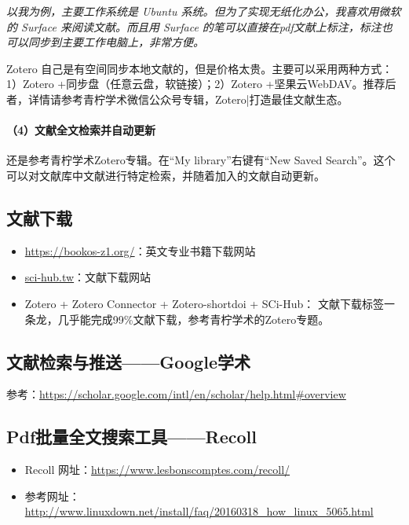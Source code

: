 \emph{以我为例，主要工作系统是 Ubuntu 系统。但为了实现无纸化办公，我喜欢用微软的 Surface 来阅读文献。而且用 Surface 的笔可以直接在pdf文献上标注，标注也可以同步到主要工作电脑上，非常方便。}

Zotero 自己是有空间同步本地文献的，但是价格太贵。主要可以采用两种方式：1）Zotero +同步盘（任意云盘，软链接）；2）Zotero +坚果云WebDAV。推荐后者，详情请参考青柠学术微信公众号专辑，Zotero|打造最佳文献生态。

\paragraph{（4）文献全文检索并自动更新}
还是参考青柠学术Zotero专辑。在“My library”右键有“New Saved Search”。这个可以对文献库中文献进行特定检索，并随着加入的文献自动更新。



\subsection{文献下载}
\begin{itemize}
\item \url{https://bookos-z1.org/}：英文专业书籍下载网站
\item \url{sci-hub.tw}：文献下载网站
\item Zotero + Zotero Connector + Zotero-shortdoi + SCi-Hub： 文献下载标签一条龙，几乎能完成99\%文献下载，参考青柠学术的Zotero专题。
\end{itemize}


\subsection{文献检索与推送——Google学术}
参考：\url{https://scholar.google.com/intl/en/scholar/help.html#overview}



\subsection{Pdf批量全文搜索工具——Recoll}
\begin{itemize}
\item Recoll 网址：\url{https://www.lesbonscomptes.com/recoll/}

\item 参考网址：\url{http://www.linuxdown.net/install/faq/20160318_how_linux_5065.html}
\end{itemize}





